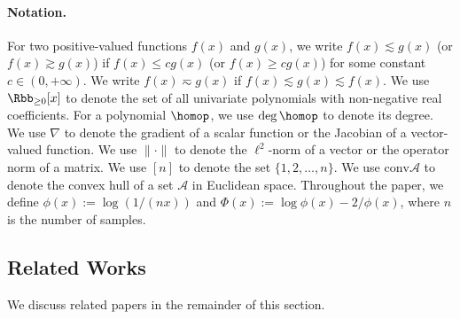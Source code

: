 \paragraph{Notation.} 
For two positive-valued functions $f(x)$ and $g(x)$, we write  $f(x)\lesssim g(x)$ (or $f(x)\gtrsim g(x)$)
if $f(x) \le cg(x)$ (or $f(x) \ge cg(x)$) for some constant 
$c \in (0, +\infty)$. 
We write 
$f(x) \eqsim g(x) $ if $f(x) \lesssim g(x) \lesssim f(x)$.
We use $\Rbb_{\ge 0}[x]$ to denote the set of all univariate polynomials with non-negative real coefficients.
For a polynomial $\homop$, we use $\deg \homop$ to denote its degree.
We use $\nabla$ to denote the gradient of a scalar function or the Jacobian of a vector-valued function. We use $\|\cdot \|$ to denote the $\ell^2$-norm of a vector or the operator norm of a matrix. We use $[n]$ to denote the set $\{1,2,\ldots,n\}$. 
We use $\text{conv} \mathcal{A}$ to denote the convex hull of a set $\mathcal{A}$ in Euclidean space. 
Throughout the paper, we define $\phi(x) := \log (1 / (nx))$ 
and $\Phi(x) := \log \phi(x) - 2 / \phi(x)$, where $n$ is the number of samples. 

\subsection{Related Works} \label{sec:related} 
We discuss related papers in the remainder of this section.

